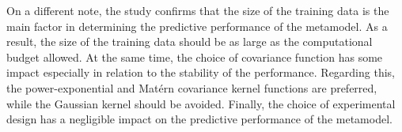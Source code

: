 On a different note, the study confirms that the size of the training data is the main factor in determining the predictive performance of the metamodel.
As a result, the size of the training data should be as large as the computational budget allowed.
At the same time, the choice of covariance function has some impact especially in relation to the stability of the performance.
Regarding this, the power-exponential and Mat\'ern covariance kernel functions are preferred,
while the Gaussian kernel should be avoided.
Finally,
the choice of experimental design has a negligible impact on the predictive performance of the metamodel.
